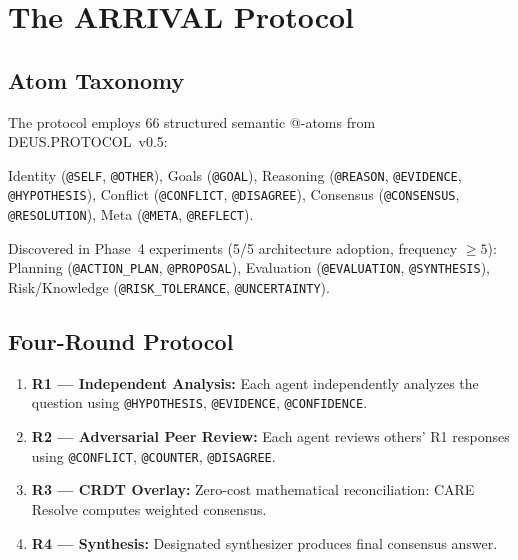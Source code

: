 \documentclass[11pt,a4paper]{article}
\begin{document}
\section{The ARRIVAL Protocol}\label{sec:protocol}

\subsection{Atom Taxonomy}

The protocol employs 66 structured semantic @-atoms from
DEUS.PROTOCOL~v0.5:

\begin{definitionbox}
Identity (\texttt{@SELF}, \texttt{@OTHER}), Goals (\texttt{@GOAL}),
Reasoning (\texttt{@REASON}, \texttt{@EVIDENCE},
\texttt{@HYPOTHESIS}), Conflict (\texttt{@CONFLICT},
\texttt{@DISAGREE}), Consensus (\texttt{@CONSENSUS},
\texttt{@RESOLUTION}), Meta (\texttt{@META}, \texttt{@REFLECT}).
\end{definitionbox}

\begin{definitionbox}
Discovered in Phase~4 experiments (5/5 architecture adoption,
frequency $\geq 5$): Planning (\texttt{@ACTION\_PLAN},
\texttt{@PROPOSAL}), Evaluation (\texttt{@EVALUATION},
\texttt{@SYNTHESIS}), Risk/Knowledge (\texttt{@RISK\_TOLERANCE},
\texttt{@UNCERTAINTY}).
\end{definitionbox}

\subsection{Four-Round Protocol}

\begin{enumerate}
  \item \textbf{R1 --- Independent Analysis:} Each agent independently
    analyzes the question using \texttt{@HYPOTHESIS},
    \texttt{@EVIDENCE}, \texttt{@CONFIDENCE}.
  \item \textbf{R2 --- Adversarial Peer Review:} Each agent reviews
    others' R1 responses using \texttt{@CONFLICT},
    \texttt{@COUNTER}, \texttt{@DISAGREE}.
  \item \textbf{R3 --- CRDT Overlay:} Zero-cost mathematical
    reconciliation: CARE Resolve computes weighted consensus.
  \item \textbf{R4 --- Synthesis:} Designated synthesizer produces
    final consensus answer.
\end{enumerate}
\end{document}
